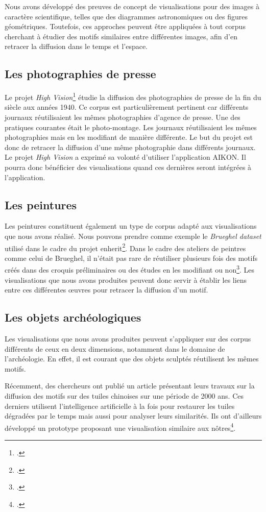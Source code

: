 Nous avons développé des preuves de concept de visualisations pour des images à caractère scientifique, telles que des diagrammes astronomiques ou des figures géométriques. Toutefois, ces approches peuvent être appliquées à tout corpus cherchant à étudier des motifs similaires entre différentes images, afin d'en retracer la diffusion dans le temps et l'espace.


\subsection{Les photographies de presse}

Le projet \textit{High Vision}\footcite{HIGHVISIONProjet2025} étudie la diffusion des photographies de presse de la fin du \XIX siècle aux années 1940. Ce corpus est particulièrement pertinent car différents journaux réutilisaient les mêmes photographies d'agence de presse. Une des pratiques courantes était le photo-montage. Les journaux réutilisaient les mêmes photographies mais en les modifiant de manière différente. Le but du projet est donc de retracer la diffusion d'une même photographie dans différents journaux. Le projet \textit{High Vision} a exprimé sa volonté d'utiliser l'application AIKON. Il pourra donc bénéficier des visualisations quand ces dernières seront intégrées à l'application.

\subsection{Les peintures}

Les peintures constituent également un type de corpus adapté aux visualisations que nous avons réalisé. Nous pouvons prendre comme exemple le \textit{Brueghel dataset} utilisé dans le cadre du projet \gls{enherit}\footcite{EnHeritEnhancingHeritage}. Dans le cadre des ateliers de peintres comme celui de Brueghel, il n'était pas rare de réutiliser plusieurs fois des motifs créés dans des croquis préliminaires ou des études en les modifiant ou non\footcite{shenDiscoveringVisualPatterns2019}. Les visualisations que nous avons produites peuvent donc servir à établir les liens entre ces différentes œuvres pour retracer la diffusion d'un motif.

\subsection{Les objets archéologiques}

Les visualisations que nous avons produites peuvent s'appliquer sur des corpus différents de ceux en deux dimensions, notamment dans le domaine de l'archéologie. En effet, il est courant que des objets sculptés réutilisent les mêmes motifs. 

Récemment, des chercheurs ont publié un article présentant leurs travaux sur la diffusion des motifs sur des tuiles chinoises sur une période de 2000 ans. Ces derniers utilisent l'intelligence artificielle à la fois pour restaurer les tuiles dégradées par le temps mais aussi pour analyser leurs similarités. Ils ont d'ailleurs développé un prototype proposant une visualisation similaire aux nôtres\footcite{yuEmbodiedHeritageIntegrating2025a}. 